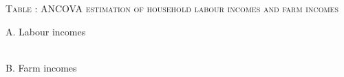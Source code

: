\hspace{-1cm}\begin{minipage}[t]{14cm}
\hfil\textsc{\normalsize Table \thetable: ANCOVA estimation of household labour incomes and farm incomes\label{tab ANCOVA LabourIncomes}}\\
\setlength{\tabcolsep}{.5pt}
\setlength{\baselineskip}{8pt}
\renewcommand{\arraystretch}{.55}

\vspace{2ex}
A. Labour incomes\\
\hfil{}\\
B. Farm incomes\\
\hfil{}\\


\end{minipage}
